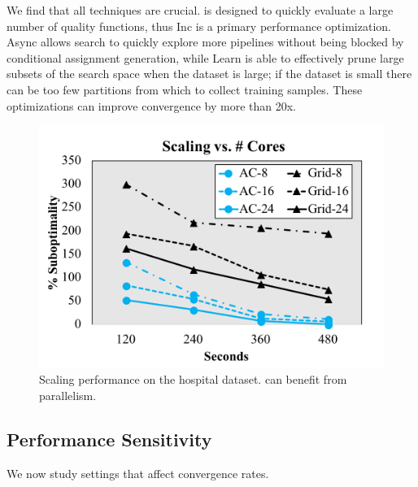 We find that all techniques are crucial.  \sys is designed to quickly evaluate a large number of quality functions, thus Inc is a primary performance optimization. 
Async allows search to quickly explore more pipelines without being blocked by conditional assignment generation, while Learn is able to effectively prune large subsets of the search space when the dataset is large; if the dataset is small there can be too few partitions from which to collect training samples.
These optimizations can improve convergence by more than 20x.



\begin{figure}[t]
\centering
 \includegraphics[width=0.8\columnwidth]{exp/exp3.png}
 \caption{Scaling performance on the hospital dataset. \sys can benefit from parallelism. \label{exp3}}
\end{figure}

\subsection{\sys Performance Sensitivity}
We now study settings that affect \sys convergence rates.

